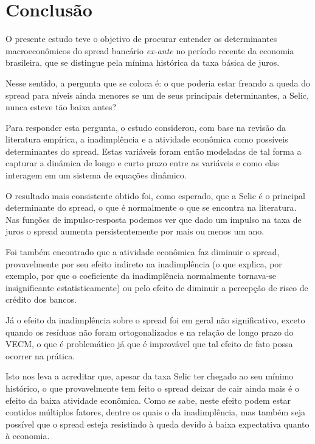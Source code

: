 \documentclass[a4paper,
               article,
               12pt,
               openany,
               oneside,
               english,
               brazil]{abntex2}
\numberwithin{equation}{section}
\begin{document}
    \section{Conclusão}

    O presente estudo teve o objetivo de procurar entender os determinantes macroeconômicos do spread bancário \textit{ex-ante} no período recente da economia brasileira, que se distingue pela mínima histórica da taxa básica de juros. 
    
    Nesse sentido, a pergunta que se coloca é: o que poderia estar freando a queda do spread para níveis ainda menores se um de seus principais determinantes, a Selic, nunca esteve tão baixa antes?

    Para responder esta pergunta, o estudo considerou, com base na revisão da literatura empírica, a inadimplência e a atividade econômica como possíveis determinantes do spread. Estas variáveis foram então modeladas de tal forma a capturar a dinâmica de longo e curto prazo entre as variáveis e como elas interagem em um sistema de equações dinâmico.

    O resultado mais consistente obtido foi, como esperado, que a Selic é o principal determinante do spread, o que é normalmente o que se encontra na literatura. Nas funções de impulso-resposta podemos ver que dado um impulso na taxa de juros o spread aumenta persistentemente por mais ou menos um ano.

    Foi também encontrado que a atividade econômica faz diminuir o spread, provavelmente por seu efeito indireto na inadimplência (o que explica, por exemplo, por que o coeficiente da inadimplência normalmente tornava-se insignificante estatisticamente) ou pelo efeito de diminuir a percepção de risco de crédito dos bancos.

    Já o efeito da inadimplência sobre o spread foi em geral não significativo, exceto quando os resíduos não foram ortogonalizados e na relação de longo prazo do VECM, o que é problemático já que é improvável que tal efeito de fato possa ocorrer na prática.

    Isto nos leva a acreditar que, apesar da taxa Selic ter chegado ao seu mínimo histórico, o que provavelmente tem feito o spread deixar de cair ainda mais é o efeito da baixa atividade econômica. Como se sabe, neste efeito podem estar contidos múltiplos fatores, dentre os quais o da inadimplência, mas também seja possível que o spread esteja resistindo à queda devido à baixa expectativa quanto à economia.
\end{document}
